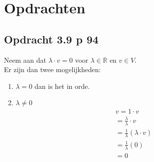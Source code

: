 \documentclass[lineaire_algebra_oplossingen.tex]{subfiles}
\begin{document}
\section{Opdrachten}

\subsection{Opdracht 3.9 p 94}
\label{3.9}
Neem aan dat $\lambda \cdot v = 0$ voor $\lambda \in \mathbb{R}$ en $v \in V$.\\
Er zijn dan twee mogelijkheden:\\
\begin{enumerate}
\item $\lambda = 0$ dan is het in orde.
\item $\lambda \neq 0$
\begin{align*}
v = 1\cdot v \tag{co\"effici\"ent}
\\
= \frac{\lambda}{\lambda}\cdot v
\\
= \frac{1}{\lambda}(\lambda \cdot v) \tag{gemegde associativiteit}
\\
= \frac{1}{\lambda}(0) \tag{lemma 3.8.1}
\\
= 0
\end{align*}
\end{enumerate}
\end{document}
